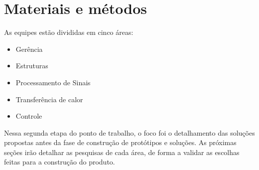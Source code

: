 \chapter{Materiais e métodos}

As equipes estão divididas em cinco áreas:
\begin{itemize}
\item Gerência
\item Estruturas
\item Processamento de Sinais
\item Transferência de calor
\item Controle
\end{itemize}

Nessa segunda etapa do ponto de trabalho, o foco foi o detalhamento das soluções propostas antes da fase de construção de protótipos e soluções. As próximas seções irão detalhar as pesquisas de cada área, de forma a validar as escolhas feitas para a construção do produto.
